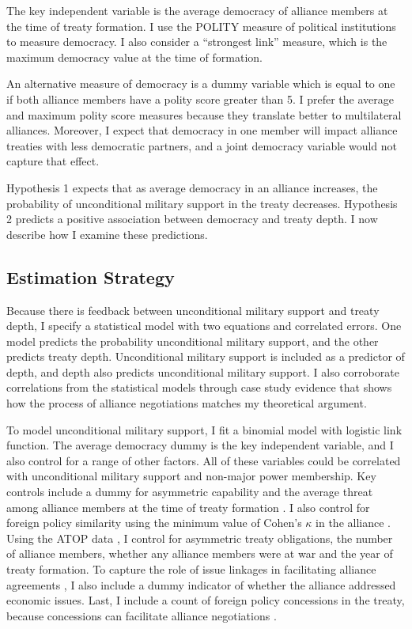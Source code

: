 \documentclass[12pt]{article}
\begin{document}
The key independent variable is the average democracy of alliance members at the time of treaty formation. 
I use the POLITY measure of political institutions to measure democracy. 
I also consider a ``strongest link'' measure, which is the maximum democracy value at the time of formation.


An alternative measure of democracy is a dummy variable which is equal to one if both alliance members have a polity score greater than 5. 
I prefer the average and maximum polity score measures because they translate better to multilateral alliances. 
Moreover, I expect that democracy in one member will impact alliance treaties with less democratic partners, and a joint democracy variable would not capture that effect. 


Hypothesis 1 expects that as average democracy in an alliance increases, the probability of unconditional military support in the treaty decreases.
Hypothesis 2 predicts a positive association between democracy and treaty depth. 
I now describe how I examine these predictions. 


\subsection{Estimation Strategy}


Because there is feedback between unconditional military support and treaty depth, I specify a statistical model with two equations and correlated errors.
One model predicts the probability unconditional military support, and the other predicts treaty depth.
Unconditional military support is included as a predictor of depth, and depth also predicts unconditional military support.  
I also corroborate correlations from the statistical models through case study evidence that shows how the process of alliance negotiations matches my theoretical argument.


To model unconditional military support, I fit a binomial model with logistic link function. 
The average democracy dummy is the key independent variable, and I also control for a range of other factors.
All of these variables could be correlated with unconditional military support and non-major power membership. 
Key controls include a dummy for asymmetric capability \citep{Mattes2012} and the average threat among alliance members at the time of treaty formation \citep{LeedsSavun2007}. 
I also control for foreign policy similarity \citep{Benson2012} using the minimum value of Cohen's $\kappa$ in the alliance \citep{Hage2011}.
Using the ATOP data \citep{Leedsetal2002}, I control for asymmetric treaty obligations, the number of alliance members, whether any alliance members were at war and the year of treaty formation. 
To capture the role of issue linkages in facilitating alliance agreements \citep{Poast2012, Poast2013}, I also include a dummy indicator of whether the alliance addressed economic issues.  
Last, I include a count of foreign policy concessions in the treaty, because concessions can facilitate alliance negotiations \citep{Johnson2015}. 
\end{document}
